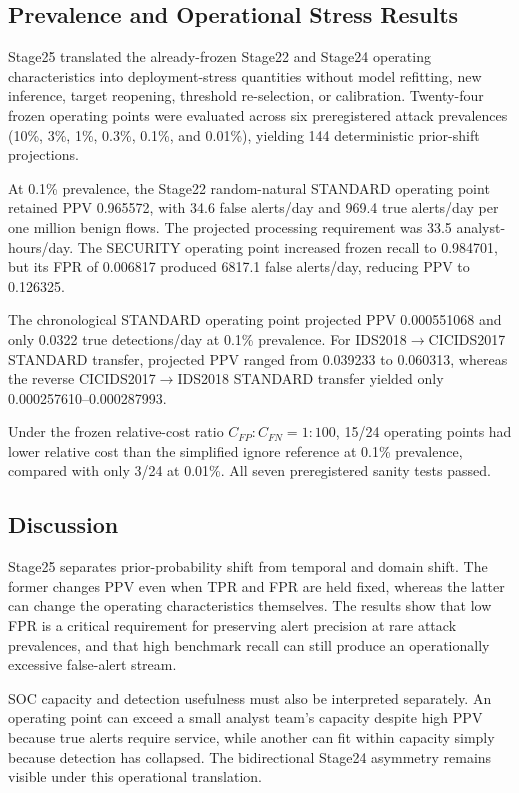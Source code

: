 
\subsection{Prevalence and Operational Stress Results}

Stage25 translated the already-frozen Stage22 and Stage24 operating
characteristics into deployment-stress quantities without model
refitting, new inference, target reopening, threshold re-selection, or
calibration. Twenty-four frozen operating points were evaluated across
six preregistered attack prevalences (10\%, 3\%, 1\%, 0.3\%, 0.1\%,
and 0.01\%), yielding 144 deterministic prior-shift projections.

At 0.1\% prevalence, the Stage22 random-natural STANDARD operating point
retained PPV 0.965572, with
34.6 false alerts/day and
969.4 true alerts/day per one million
benign flows. The projected processing requirement was
33.5
analyst-hours/day. The SECURITY operating point increased frozen recall
to 0.984701, but its FPR of
0.006817 produced
6817.1 false alerts/day, reducing PPV
to 0.126325.

The chronological STANDARD operating point projected PPV
0.000551068 and only
0.0322 true detections/day at 0.1\%
prevalence. For IDS2018$\rightarrow$CICIDS2017 STANDARD transfer,
projected PPV ranged from 0.039233 to
0.060313, whereas the reverse
CICIDS2017$\rightarrow$IDS2018 STANDARD transfer yielded only
0.000257610--0.000287993.

Under the frozen relative-cost ratio $C_{FP}:C_{FN}=1:100$, 15/24
operating points had lower relative cost than the simplified ignore
reference at 0.1\% prevalence, compared with only 3/24 at 0.01\%.
All seven preregistered sanity tests passed.

\subsection{Discussion}

Stage25 separates prior-probability shift from temporal and domain shift.
The former changes PPV even when TPR and FPR are held fixed, whereas the
latter can change the operating characteristics themselves. The results
show that low FPR is a critical requirement for preserving alert
precision at rare attack prevalences, and that high benchmark recall can
still produce an operationally excessive false-alert stream.

SOC capacity and detection usefulness must also be interpreted
separately. An operating point can exceed a small analyst team's capacity
despite high PPV because true alerts require service, while another can
fit within capacity simply because detection has collapsed. The
bidirectional Stage24 asymmetry remains visible under this operational
translation.

